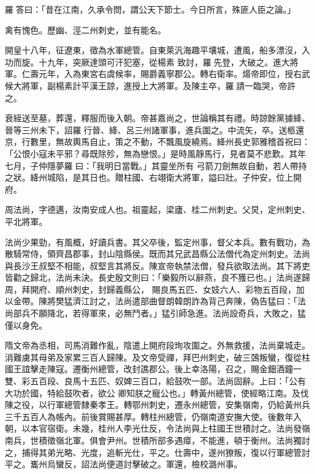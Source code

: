 \begin{pinyinscope}
 羅答曰：「昔在江南，久承令問，謂公天下節士。今日所言，殊匪人臣之論。」



 禽有愧色。歷幽、涇二州刺史，並有能名。



 開皇十八年，征遼東，徵為水軍總管。自東萊汎海趣平壤城，遭風，船多漂沒，入功而旋。十九年，突厥達頭可汗犯塞，從楊素
 致討，羅先登，大破之。進大將軍。仁壽元年，入為東宮右虞候率，賜爵義寧郡公。轉右衛率。煬帝即位，授右武候大將軍，副楊素計平漢王諒，進授上大將軍。及陳主卒，羅請一臨哭，帝許之。



 衰絰送至墓，葬還，釋服而後入朝。帝甚嘉尚之，世論稱其有禮。時諒餘黨據絳、晉等三州未下，詔羅行晉、絳、呂三州諸軍事，進兵圍之。中流矢，卒。送柩還京，行數里，無故輿馬自止，策之不動，不飄風旋繞焉。絳州長史郭雅稽首祝曰：「公恨小寇未平邪？尋既除殄，無為戀恨。」是時風靜馬行，見者莫不悲歎。其年七月，子仲隱夢羅曰：「我明日當戰。」其靈坐所有
 弓箭刀劍無故自動，若人帶持之狀。絳州城陷，是其日也。贈柱國、右翊衛大將軍，謚曰壯。子仲安，位上開府。



 周法尚，字德邁，汝南安成人也。祖靈起，梁廬、桂二州刺史。父炅，定州刺史、平北將軍。



 法尚少果勁，有風概，好讀兵書。其父卒後，監定州事，督父本兵。數有戰功，為散騎常侍，領齊昌郡事，封山陰縣侯。既而其兄武昌縣公法僧代為定州刺史。法尚與長沙王叔堅不相能，叔堅言其將反。陳宣帝執禁法僧，發兵欲取法尚。其下將吏皆勸之歸北，法尚未決。長史殷文則曰：「樂毅所以辭燕，良不獲已也。」法尚遂歸周，拜開府、順州刺史，封歸義縣公，
 賜良馬五匹、女妓六人、彩物五百段，加以金帶。陳將樊猛濟江討之，法尚遣部曲督朗韓朗詐為背己奔陳，偽告猛曰：「法尚部兵不願降北，若得軍來，必無鬥者。」猛引師急進。法尚設奇兵，大敗之，猛僅以身免。



 隋文帝為丞相，司馬消難作亂，陰遣上開府段珣攻圍之。外無救援，法尚棄城走。消難虜其母弟及家累三百人歸陳。及文帝受禪，拜巴州刺史，破三鵶叛蠻，復從柱國王誼擊走陳寇。遷衡州總管，改封譙郡公。後上幸洛陽，召之，賜金鈿酒鐘一雙、彩五百段、良馬十五匹、奴婢三百口，給鼓吹一部。法尚固辭。上曰：「公有大功於國，特給鼓吹者，欲公
 卿知朕之寵公也。」轉黃州總管，使經略江南。及伐陳之役，以行軍總管隸秦孝王。轉鄂州刺史，遷永州總管，安集嶺南，仍給黃州兵三千五百人為帳內。前後賞賜甚厚。轉柱州總管，仍嶺南道安撫大使。後數年入朝，以本官宿衛。未幾，桂州人李光仕反，令法尚與上柱國王世積討之。法尚發嶺南兵，世積徵嶺北軍。俱會尹州。世積所部多遇瘴，不能進，頓于衡州。法尚獨討之，捕得其弟光略、光度，追斬光仕，平之。仕壽中，遂州獠叛，復以行軍總管討平之。巂州烏蠻反，詔法尚便道討擊破之。軍還，檢校潞州事。




\end{pinyinscope}
